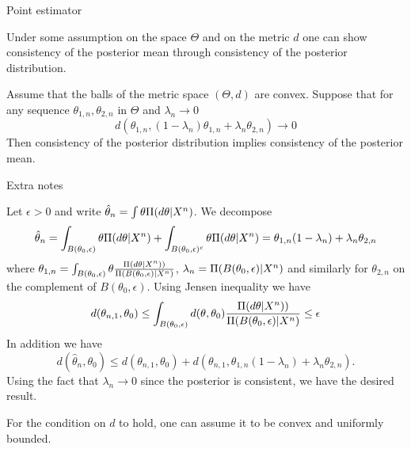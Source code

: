 {Point estimator}

Under some assumption on the space $\Theta$ and on the metric $d$ one can show consistency of the posterior mean through consistency of the posterior distribution. 
\begin{theorem}
Assume that the balls of the metric space $(\Theta,d)$ are convex. Suppose that for any sequence $\theta_{1,n}, \theta_{2,n}$ in $\Theta$ and $\lambda_n \to 0$
$$
d(\theta_{1,n}, (1-\lambda_n) \theta_{1,n} + \lambda_n \theta_{2,n}) \to 0 
$$
Then consistency of the posterior distribution implies consistency of the posterior mean. 
\end{theorem}










{Extra notes}

	Let $\epsilon >0$ and write $\hat{\theta}_n = \int \theta \Pi(d\theta|X^n)$. We decompose 
	$$
\hat{\theta}_n = \int_{B(\theta_0,\epsilon)} \theta \Pi(d\theta|X^n) + \int_{B(\theta_0,\epsilon)^c} \theta \Pi(d\theta|X^n) = \theta_{1,n} (1-\lambda_n) + \lambda_n\theta_{2,n}
	$$
	where $\theta_{1,n} =\int_{B(\theta_0,\epsilon)} \theta \frac{\Pi(d\theta|X^n))}{\Pi(B(\theta_0,\epsilon)|X^n)} $, $\lambda_n = \Pi(B(\theta_0,\epsilon)|X^n)$ and similarly for $\theta_{2,n}$ on the complement of $B(\theta_0,\epsilon)$.
	Using Jensen inequality we have 
	\begin{equation*}
	d(\theta_{n,1},\theta_0) \leq \int_{B(\theta_0,\epsilon)} d(\theta,\theta_0) \frac{\Pi(d\theta|X^n))}{\Pi(B(\theta_0,\epsilon)|X^n)} \leq \epsilon
	\end{equation*}
	In addition we have 
	$$
	d(\hat{\theta}_n,\theta_0) \leq d(\theta_{n,1},\theta_0) + d(\theta_{n,1}, \theta_{1,n} (1-\lambda_n) + \lambda_n\theta_{2,n} ).
	$$
	Using the fact that $\lambda_n \to 0$ since the posterior is consistent, we have the desired result. 
	\begin{remark}
	For the condition on $d$ to hold, one can assume it to be convex and uniformly bounded. 
	\end{remark}






